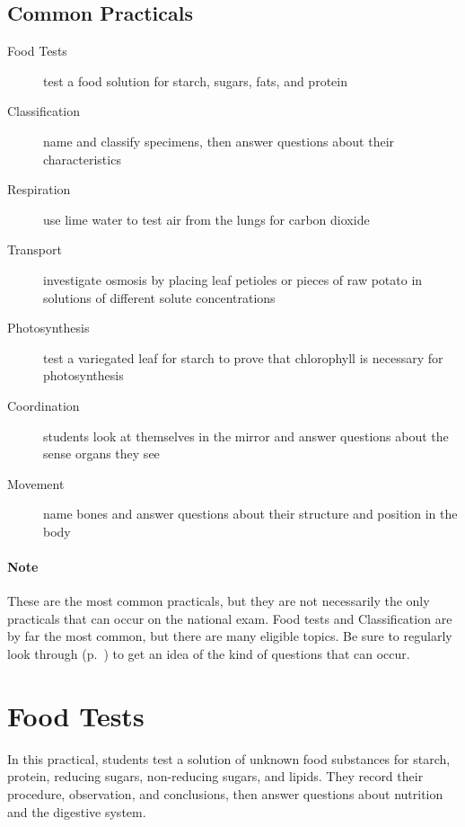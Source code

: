 \subsection{Common Practicals}
\begin{description}
\item[Food Tests]{test a food solution for starch, sugars, fats, and protein}
\item[Classification]{name and classify specimens, then answer questions about their characteristics}
\item[Respiration]{use lime water to test air from the lungs for carbon dioxide}
\item[Transport]{investigate osmosis by placing leaf petioles or pieces of raw potato in solutions of different solute concentrations}
\item[Photosynthesis]{test a variegated leaf for starch to prove that chlorophyll is necessary for photosynthesis}
\item[Coordination]{students look at themselves in the mirror and answer questions about the sense organs they see}
\item[Movement]{name bones and answer questions about their structure and position in the body}
\end{description}

\paragraph{Note} These are the most common practicals, but they are not necessarily the only practicals that can occur on the national exam. Food tests and Classification are by far the most common, but there are many eligible topics. Be sure to regularly look through  (p.~\pageref{cha:past-papers-bio}) to get an idea of the kind of questions that can occur.

\section{Food Tests}  

In this practical, students test a solution of unknown food substances for starch, protein, reducing sugars, non-reducing sugars, and lipids. They record their procedure, observation, and conclusions, then answer questions about nutrition and the digestive system.\\

